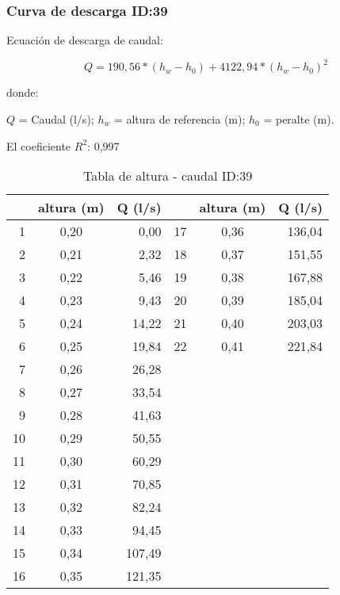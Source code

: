 \documentclass[]{article}
\begin{document}
\subsubsection{Curva de descarga ID:39}\label{ID:39}

Ecuación de descarga de caudal:

\[Q = 190,56*(h_w - h_0) + 4122,94*{(h_w - h_0)^2}\]

donde:

\(Q\) = Caudal (l/s); \(h_w\) = altura de referencia (m); \(h_0\) =
peralte (m).

El coeficiente \(R^2\): 0,997


\begin{table}[H]

\caption{Tabla de altura - caudal ID:39}
\centering

\begin{center}
\begingroup\fontsize{10pt}{11pt}\selectfont
\begin{tabular}{rcrrcr}
  \hline
 & altura (m) & Q (l/s) &  & altura (m) & Q (l/s) \\ 
  \hline
  1 & 0,20 & 0,00 &  17 & 0,36 & 136,04 \\ 
    2 & 0,21 & 2,32 &  18 & 0,37 & 151,55 \\ 
    3 & 0,22 & 5,46 &  19 & 0,38 & 167,88 \\ 
    4 & 0,23 & 9,43 &  20 & 0,39 & 185,04 \\ 
    5 & 0,24 & 14,22 &  21 & 0,40 & 203,03 \\ 
    6 & 0,25 & 19,84 &  22 & 0,41 & 221,84 \\ 
    7 & 0,26 & 26,28 &  &  &  \\ 
    8 & 0,27 & 33,54 &  &  &  \\ 
    9 & 0,28 & 41,63 &  &  &  \\ 
   10 & 0,29 & 50,55 &  &  &  \\ 
   11 & 0,30 & 60,29 &  &  &  \\ 
   12 & 0,31 & 70,85 &  &  &  \\ 
   13 & 0,32 & 82,24 &  &  &  \\ 
   14 & 0,33 & 94,45 &  &  &  \\ 
   15 & 0,34 & 107,49 &  &  &  \\ 
   16 & 0,35 & 121,35 &  &  &  \\ 
   \hline
\end{tabular}
\endgroup\end{center}
\end{table}
\end{document}
